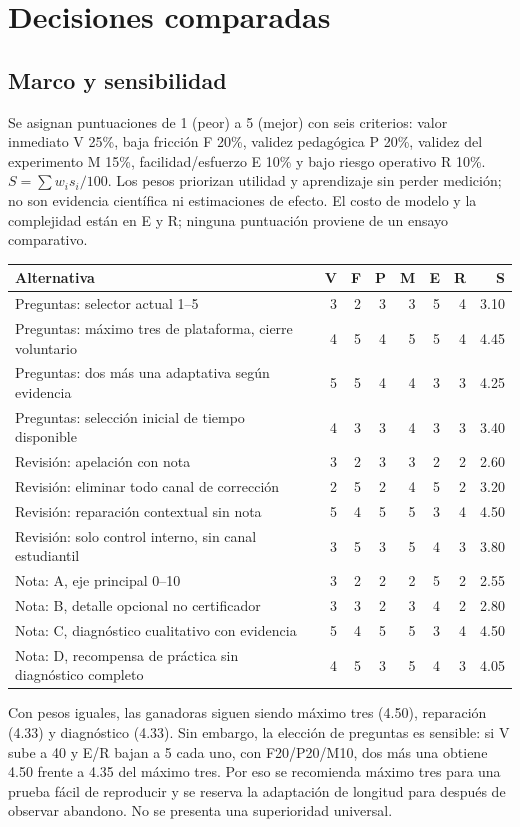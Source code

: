 \documentclass[11pt,a4paper]{report}
\begin{document}
\chapter{Decisiones comparadas}
\label{ch:decisiones}
\section{Marco y sensibilidad}
Se asignan puntuaciones de 1 (peor) a 5 (mejor) con seis criterios: valor inmediato V 25\%, baja fricción F 20\%, validez pedagógica P 20\%, validez del experimento M 15\%, facilidad/esfuerzo E 10\% y bajo riesgo operativo R 10\%. \(S=\sum w_i s_i/100\). Los pesos priorizan utilidad y aprendizaje sin perder medición; no son evidencia científica ni estimaciones de efecto. El costo de modelo y la complejidad están en E y R; ninguna puntuación proviene de un ensayo comparativo.

\begin{longtable}{P{7cm}rrrrrrr}
\toprule Alternativa & V & F & P & M & E & R & S \\\midrule\endhead
Preguntas: selector actual 1--5 & 3&2&3&3&5&4&3.10\\
Preguntas: máximo tres de plataforma, cierre voluntario & 4&5&4&5&5&4&4.45\\
Preguntas: dos más una adaptativa según evidencia & 5&5&4&4&3&3&4.25\\
Preguntas: selección inicial de tiempo disponible & 4&3&3&4&3&3&3.40\\\midrule
Revisión: apelación con nota &3&2&3&3&2&2&2.60\\
Revisión: eliminar todo canal de corrección &2&5&2&4&5&2&3.20\\
Revisión: reparación contextual sin nota &5&4&5&5&3&4&4.50\\
Revisión: solo control interno, sin canal estudiantil &3&5&3&5&4&3&3.80\\\midrule
Nota: A, eje principal 0--10 &3&2&2&2&5&2&2.55\\
Nota: B, detalle opcional no certificador &3&3&2&3&4&2&2.80\\
Nota: C, diagnóstico cualitativo con evidencia &5&4&5&5&3&4&4.50\\
Nota: D, recompensa de práctica sin diagnóstico completo &4&5&3&5&4&3&4.05\\\bottomrule
\end{longtable}

Con pesos iguales, las ganadoras siguen siendo máximo tres (4.50), reparación (4.33) y diagnóstico (4.33). Sin embargo, la elección de preguntas es sensible: si V sube a 40 y E/R bajan a 5 cada uno, con F20/P20/M10, dos más una obtiene 4.50 frente a 4.35 del máximo tres. Por eso se recomienda máximo tres para una prueba fácil de reproducir y se reserva la adaptación de longitud para después de observar abandono. No se presenta una superioridad universal.
\end{document}
